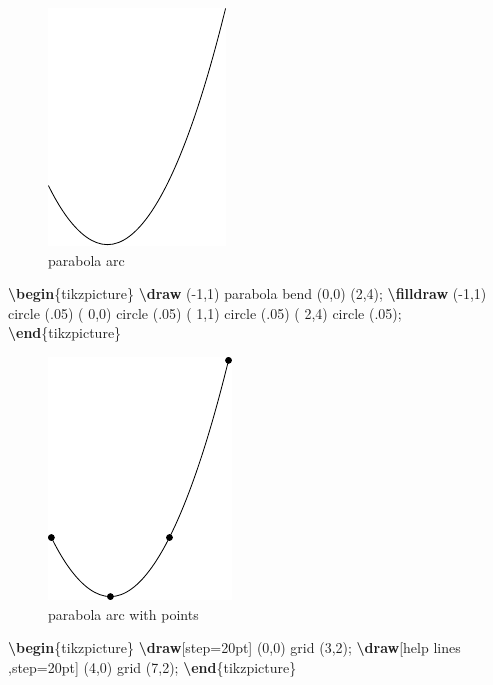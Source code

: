 \documentclass[
]{book}
\newenvironment{Shaded}{\begin{snugshade}}{\end{snugshade}}
\newcommand{\ExtensionTok}[1]{#1}
\newcommand{\FunctionTok}[1]{\textcolor[rgb]{0.13,0.29,0.53}{\textbf{#1}}}
\newcommand{\KeywordTok}[1]{\textcolor[rgb]{0.13,0.29,0.53}{\textbf{#1}}}
\newcommand{\NormalTok}[1]{#1}
\theoremstyle{definition}
\theoremstyle{definition}
\theoremstyle{definition}
\theoremstyle{definition}
\theoremstyle{remark}
\begin{document}
\begin{figure}
\includegraphics[width=0.25\linewidth]{202401311000-TikZ_files/figure-latex/unnamed-chunk-32-1} \caption{parabola arc}\label{fig:unnamed-chunk-32}
\end{figure}

\begin{Shaded}
\begin{Highlighting}[]
\KeywordTok{\textbackslash{}begin}\NormalTok{\{}\ExtensionTok{tikzpicture}\NormalTok{\}}
  \FunctionTok{\textbackslash{}draw}\NormalTok{ ({-}1,1) parabola bend (0,0) (2,4);}
  \FunctionTok{\textbackslash{}filldraw}
\NormalTok{    ({-}1,1) circle (.05)}
\NormalTok{    ( 0,0) circle (.05)}
\NormalTok{    ( 1,1) circle (.05)}
\NormalTok{    ( 2,4) circle (.05);}
\KeywordTok{\textbackslash{}end}\NormalTok{\{}\ExtensionTok{tikzpicture}\NormalTok{\}}
\end{Highlighting}
\end{Shaded}

\begin{figure}
\includegraphics[width=0.25\linewidth]{202401311000-TikZ_files/figure-latex/unnamed-chunk-34-1} \caption{parabola arc with points}\label{fig:unnamed-chunk-34}
\end{figure}

\begin{Shaded}
\begin{Highlighting}[]
\KeywordTok{\textbackslash{}begin}\NormalTok{\{}\ExtensionTok{tikzpicture}\NormalTok{\}}
  \FunctionTok{\textbackslash{}draw}\NormalTok{[step=20pt] (0,0) grid (3,2);}
  \FunctionTok{\textbackslash{}draw}\NormalTok{[help lines ,step=20pt] (4,0) grid (7,2);}
\KeywordTok{\textbackslash{}end}\NormalTok{\{}\ExtensionTok{tikzpicture}\NormalTok{\}}
\end{Highlighting}
\end{Shaded}
\end{document}
